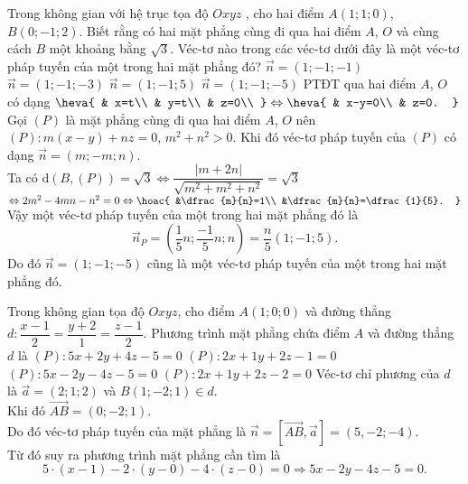 \begin{ex}%
Trong không gian với hệ trục tọa độ $Oxyz$ , cho hai điểm $ A(1;1;0)$, $ B(0;-1;2)$. Biết rằng có hai mặt phẳng cùng đi qua hai điểm $ A$, $ O$ và cùng cách $ B$ một khoảng bằng $\sqrt{3}$. Véc-tơ nào trong các véc-tơ dưới đây là một véc-tơ pháp tuyến của một trong hai mặt phẳng đó?
\choice
{$\overrightarrow{n}=(1;-1;-1)$}
{$\overrightarrow{n}=(1;-1;-3)$}
{\True $\overrightarrow{n}=(1;-1;5)$}
{$\overrightarrow{n}=(1;-1;-5)$}
\loigiai
{
PTĐT qua hai điểm $ A$, $ O$ có dạng $\heva{
& x=t\\ 
& y=t\\ 
& z=0\\ 
}\Leftrightarrow\heva{
& x-y=0\\ 
& z=0.
}$\\
Gọi $(P)$ là mặt phẳng cùng đi qua hai điểm $ A$, $ O$ nên $(P)\colon  m\left(x-y\right)+nz=0$, $m^2+n^2>0$. Khi đó véc-tơ pháp tuyến của $(P)$ có dạng $\overrightarrow{n}=(m;-m;n)$.\\
Ta có $ \mathrm{d}\left(B,(P)\right)=\sqrt{3}\Leftrightarrow\dfrac{\left| m+2n\right|}{\sqrt{m^2+m^2+n^2}}=\sqrt{3}$ $\Leftrightarrow 2m^2-4mn-n^2=0\Leftrightarrow\hoac{
&\dfrac{m}{n}=1\\ 
&\dfrac{m}{n}=\dfrac{1}{5}.
}$\\
Vậy một véc-tơ pháp tuyến của một trong hai mặt phẳng đó là $$\overrightarrow{n}_P=\left(\dfrac{1}{5}n; \dfrac{-1}{5}n; n\right)=\dfrac{n}{5}\left(1; -1; 5\right).$$
 Do đó $\overrightarrow{n}=(1;-1;-5)$ cũng là một véc-tơ pháp tuyến của một trong hai mặt phẳng đó.}
\end{ex}

\begin{ex}%
Trong không gian tọa độ $ Oxyz$, cho điểm $A(1;0;0)$ và đường thẳng \break $ d\colon\dfrac{x-1}{2}=\dfrac{y+2}{1}=\dfrac{z-1}{2}$. Phương trình mặt phẳng chứa điểm $A$ và đường thẳng $d$ là
\choice
{$(P)\colon 5x+2y+4z-5=0$}
{$(P)\colon 2x+1y+2z-1=0$}
{\True $(P)\colon 5x-2y-4z-5=0$}
{$(P)\colon 2x+1y+2z-2=0$}
\loigiai
{
Véc-tơ chỉ phương của $ d$ là $\overrightarrow{a}=(2; 1; 2)$ và $ B(1; -2; 1)\in d$.\\
Khi đó $\overrightarrow{AB}=(0; -2; 1)$.\\
Do đó véc-tơ pháp tuyến của mặt phẳng là $\overrightarrow{n}=\left[\overrightarrow{AB},\overrightarrow{a}\right]=(5,-2;-4)$.\\
Từ đó suy ra phương trình mặt phẳng cần tìm là $$ 5\cdot(x-1)-2\cdot(y-0)-4\cdot(z-0)=0\Rightarrow 5x-2y-4z-5=0.$$}
\end{ex}

